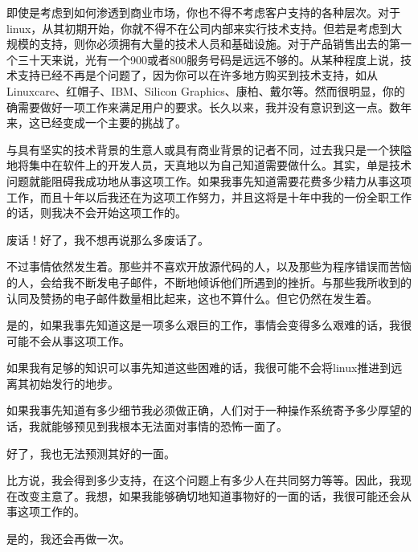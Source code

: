 即使是考虑到如何渗透到商业市场，你也不得不考虑客户支持的各种层次。对于linux，从其初期开始，你就不得不在公司内部来实行技术支持。但若是考虑到大规模的支持，则你必须拥有大量的技术人员和基础设施。对于产品销售出去的第一个三十天来说，光有一个900或者800服务号码是远远不够的。从某种程度上说，技术支持已经不再是个问题了，因为你可以在许多地方购买到技术支持，如从Linuxcare、红帽子、IBM、Silicon Graphics、康柏、戴尔等。然而很明显，你的确需要做好一项工作来满足用户的要求。长久以来，我并没有意识到这一点。数年来，这已经变成一个主要的挑战了。

与具有坚实的技术背景的生意人或具有商业背景的记者不同，过去我只是一个狭隘地将集中在软件上的开发人员，天真地以为自己知道需要做什么。其实，单是技术问题就能阻碍我成功地从事这项工作。如果我事先知道需要花费多少精力从事这项工作，而且十年以后我还在为这项工作努力，并且这将是十年中我的一份全职工作的话，则我决不会开始这项工作的。

废话！好了，我不想再说那么多废话了。

不过事情依然发生着。那些并不喜欢开放源代码的人，以及那些为程序错误而苦恼的人，会给我不断发电子邮件，不断地倾诉他们所遇到的挫折。与那些我所收到的认同及赞扬的电子邮件数量相比起来，这也不算什么。但它仍然在发生着。

是的，如果我事先知道这是一项多么艰巨的工作，事情会变得多么艰难的话，我很可能不会从事这项工作。

如果我有足够的知识可以事先知道这些困难的话，我很可能不会将linux推进到远离其初始发行的地步。

如果我事先知道有多少细节我必须做正确，人们对于一种操作系统寄予多少厚望的话，我就能够预见到我根本无法面对事情的恐怖一面了。

好了，我也无法预测其好的一面。

比方说，我会得到多少支持，在这个问题上有多少人在共同努力等等。因此，我现在改变主意了。我想，如果我能够确切地知道事物好的一面的话，我很可能还会从事这项工作的。

是的，我还会再做一次。
